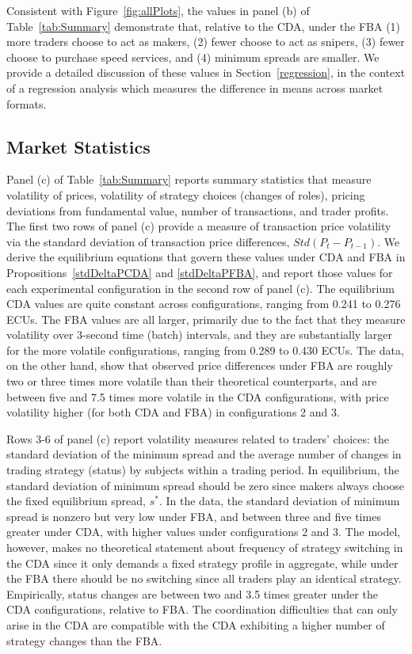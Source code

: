 \documentclass[12pt]{article}
\begin{document}
Consistent with Figure~\ref{fig:allPlots}, the values in panel (b) of Table~\ref{tab:Summary} demonstrate that, relative to the CDA, under the FBA (1) more traders choose to act as makers, (2) fewer choose to act as snipers, (3) fewer choose to purchase speed services, and (4) minimum spreads are smaller. We provide a detailed discussion of these values in Section~\ref{regression}, in the context of a regression analysis which measures the difference in means across market formats.

\subsection{Market Statistics}
\label{marketStatsSection}

Panel (c) of Table~\ref{tab:Summary} reports summary statistics that measure volatility of prices, volatility of strategy choices (changes of roles), pricing deviations from fundamental value, number of transactions, and trader profits. The first two rows of panel (c) provide a measure of transaction price volatility via the standard deviation of transaction price differences, $Std(P_t-P_{t-1})$. We derive the equilibrium equations that govern these values under CDA and FBA in Propositions~\ref{stdDeltaPCDA} and \ref{stdDeltaPFBA}, and report those values for each experimental configuration in the second row of panel (c). The equilibrium CDA values are quite constant across configurations, ranging from 0.241 to 0.276 ECUs. The FBA values are all larger, primarily due to the fact that they measure volatility over 3-second time (batch) intervals, and they are substantially larger for the more volatile configurations, ranging from 0.289 to 0.430 ECUs. The data, on the other hand, show that observed price differences under FBA are roughly two or three times more volatile than their theoretical counterparts, and are between five and 7.5 times more volatile in the CDA configurations, with price volatility higher (for both CDA and FBA) in configurations 2 and 3.

Rows 3-6 of panel (c) report volatility measures related to traders' choices: the standard deviation of the minimum spread and the average number of changes in trading strategy (status) by subjects within a trading period. In equilibrium, the standard deviation of minimum spread should be zero since makers always choose the fixed equilibrium spread, $s^*$. In the data, the standard deviation of minimum spread is nonzero but very low under FBA, and between three and five times greater under CDA, with higher values under configurations 2 and 3.
The model, however, makes no theoretical statement about frequency of strategy switching in the CDA since it only demands a fixed strategy profile in aggregate, while under the FBA there should be no switching since all traders play an identical strategy. Empirically, status changes are between two and 3.5 times greater under the CDA configurations, relative to FBA. The coordination difficulties that can only arise in the CDA are compatible with the CDA exhibiting a higher number of strategy changes than the FBA.
\end{document}
